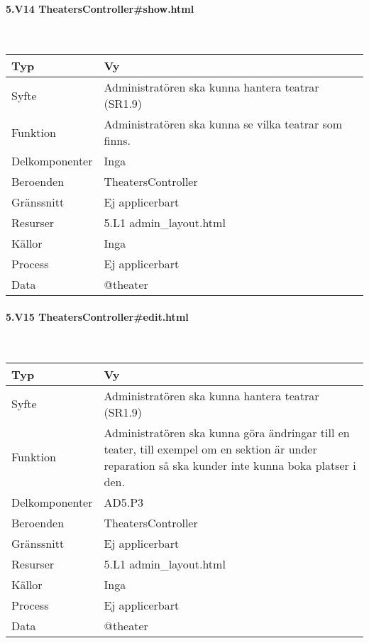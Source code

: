 \documentclass[a4paper, twoside, 11pt, titlepage]{article}
\begin{document}
			\paragraph{5.V14 TheatersController\#show.html}\

			\begin {table} [ht] \begin{tabular} {  p{3.5cm} p{9.6cm} }
				\hline
				Typ & Vy  \\
				\hline
				Syfte & Administratören ska kunna hantera teatrar (SR1.9)  \\
				\hline
				Funktion & Administratören ska kunna se vilka teatrar som finns.  \\
				\hline
				Delkomponenter & Inga  \\
				\hline
				Beroenden & TheatersController  \\
				\hline
				Gränssnitt & Ej applicerbart  \\
				\hline
				Resurser & 5.L1 admin\_layout.html  \\
				\hline
				Källor & Inga  \\
				\hline
				Process & Ej applicerbart  \\
				\hline
				Data & @theater  \\
				\hline
			\end{tabular} \end{table} \FloatBarrier


			\paragraph{5.V15 TheatersController\#edit.html}\

			\begin {table} [ht] \begin{tabular} {  p{3.5cm} p{9.6cm} }
				\hline
				Typ & Vy  \\
				\hline
				Syfte & Administratören ska kunna hantera teatrar (SR1.9)  \\
				\hline
				Funktion & Administratören ska kunna göra ändringar till en teater, till exempel om en sektion är under reparation så ska kunder inte kunna boka platser i den.  \\
				\hline
				Delkomponenter & AD5.P3  \\
				\hline
				Beroenden & TheatersController  \\
				\hline
				Gränssnitt & Ej applicerbart  \\
				\hline
				Resurser & 5.L1 admin\_layout.html  \\
				\hline
				Källor & Inga  \\
				\hline
				Process & Ej applicerbart  \\
				\hline
				Data & @theater  \\
				\hline
			\end{tabular} \end{table} \FloatBarrier
\end{document}
